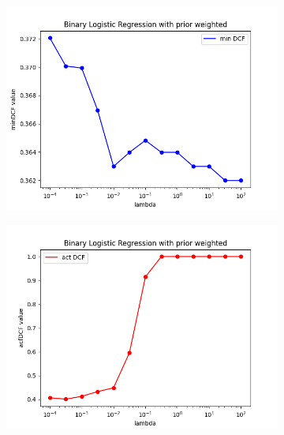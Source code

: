 \begin{figure}[h!]
    \centering
    \begin{subfigure}[b]{0.30\linewidth}
        \includegraphics[width=\linewidth]{Lab/08. Lab 08/Images/09. PW - minDCF}
        \label{fig:PWminDCF}
    \end{subfigure}
    \begin{subfigure}[b]{0.30\linewidth}
        \includegraphics[width=\linewidth]{Lab/08. Lab 08/Images/10. PW - actDCF}
        \label{fig:PWactDCF}
    \end{subfigure}
    \begin{subfigure}[b]{0.30\linewidth}

\end{subfigure}
\end{figure}
